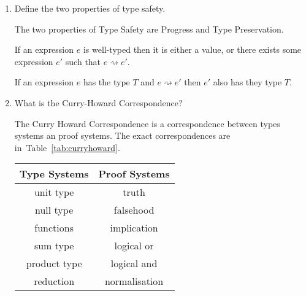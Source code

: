 \documentclass[10pt,\jkfside,a4paper]{article}
\begin{document}
\begin{enumerate}
\begin{itemize}
    \end{itemize}

    \item Define the two properties of type safety.

    The two properties of Type Safety are Progress and Type Preservation.

    \begin{definition}[Progress]

        If an expression $e$ is well-typed then it is either a value, or there exists some expression $e'$ such that $e \rightsquigarrow e'$.

    \end{definition}

    \begin{definition}

        If an expression $e$ has the type $T$ and $e \rightsquigarrow e'$ then $e'$ also has they type $T$.

    \end{definition}

    \item What is the Curry-Howard Correspondence?

    The Curry Howard Correspondence is a correspondence between types systems an proof systems. The exact correspondences are in~Table~\ref{tab:curryhoward}.

    \begin{table}[H]

        \centering

        \begin{tabular}{c|c}

            Type Systems & Proof Systems \\

            \hline

            unit type & truth \\

            null type & falsehood \\

            functions & implication \\

            sum type & logical or \\

            product type & logical and \\

            reduction & normalisation \\


\end{tabular}
\end{table}
\end{enumerate}
\end{document}
